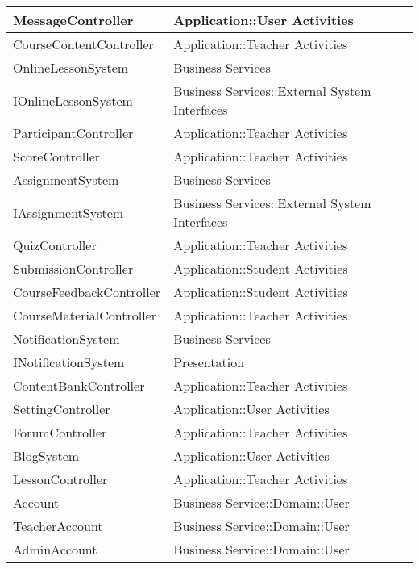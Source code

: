 \documentclass[./../main_file.tex]{subfiles}
\begin{document}
\begin{longtable}{|p{.5\linewidth}|p{.5\linewidth}|}
		MessageController        & Application::User Activities                  \\ \hline
		CourseContentController  & Application::Teacher Activities               \\ \hline
		OnlineLessonSystem       & Business Services                             \\ \hline
		IOnlineLessonSystem      & Business Services::External System Interfaces \\ \hline
		ParticipantController    & Application::Teacher Activities               \\ \hline
		ScoreController          & Application::Teacher Activities               \\ \hline
		AssignmentSystem         & Business Services                             \\ \hline
		IAssignmentSystem        & Business Services::External System Interfaces \\ \hline
		QuizController           & Application::Teacher Activities               \\ \hline
		SubmissionController     & Application::Student Activities               \\ \hline
		CourseFeedbackController & Application::Student Activities               \\ \hline
		CourseMaterialController & Application::Teacher Activities               \\ \hline
		NotificationSystem       & Business Services                             \\ \hline
		INotificationSystem      & Presentation                      \\ \hline
		ContentBankController    & Application::Teacher Activities \\ \hline
		SettingController        & Application::User Activities                  \\ \hline
		ForumController          & Application::Teacher Activities \\ \hline
		BlogSystem               & Application::User Activities                  \\ \hline
		LessonController         & Application::Teacher Activities               \\ \hline
		Account                  & Business Service::Domain::User                \\ \hline
		TeacherAccount           & Business Service::Domain::User                \\ \hline
		AdminAccount             & Business Service::Domain::User                \\ \hline

\end{longtable}
\end{document}
